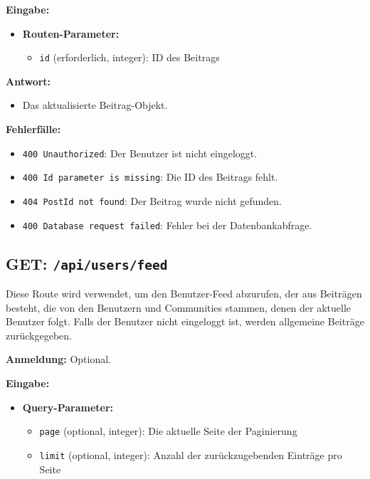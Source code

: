 \documentclass[a4paper,12pt]{article}
\begin{document}
\textbf{Eingabe:}
\begin{itemize}
    \item \textbf{Routen-Parameter:}
    \begin{itemize}
        \item \texttt{id} (erforderlich, integer): ID des Beitrags
    \end{itemize}
\end{itemize}

\textbf{Antwort:}
\begin{itemize}
    \item Das aktualisierte Beitrag-Objekt.
\end{itemize}

\textbf{Fehlerfälle:}
\begin{itemize}
    \item \texttt{400 Unauthorized}: Der Benutzer ist nicht eingeloggt.
    \item \texttt{400 Id parameter is missing}: Die ID des Beitrags fehlt.
    \item \texttt{404 PostId not found}: Der Beitrag wurde nicht gefunden.
    \item \texttt{400 Database request failed}: Fehler bei der Datenbankabfrage.
\end{itemize}

\newpage
\subsection{GET: \texttt{/api/users/feed}}

Diese Route wird verwendet, um den Benutzer-Feed abzurufen, der aus Beiträgen besteht, die von den Benutzern und Communities stammen, denen der aktuelle Benutzer folgt. Falls der Benutzer nicht eingeloggt ist, werden allgemeine Beiträge zurückgegeben.

\textbf{Anmeldung:} Optional.

\textbf{Eingabe:}
\begin{itemize}
    \item \textbf{Query-Parameter:}
    \begin{itemize}
        \item \texttt{page} (optional, integer): Die aktuelle Seite der Paginierung
        \item \texttt{limit} (optional, integer): Anzahl der zurückzugebenden Einträge pro Seite
    \end{itemize}
\end{itemize}
\end{document}
